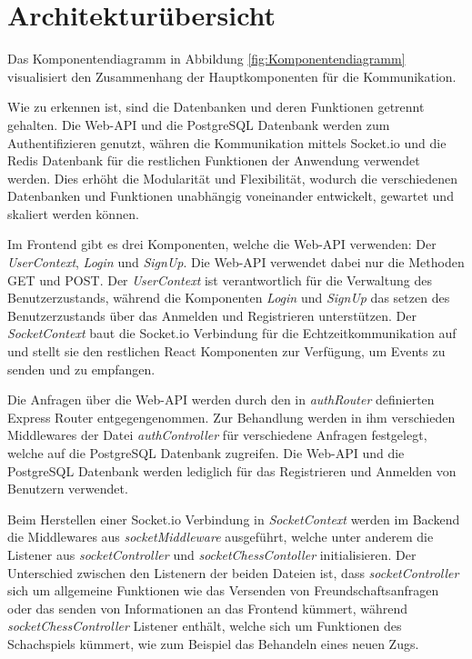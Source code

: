 \section{Architekturübersicht}
Das Komponentendiagramm in Abbildung \ref{fig:Komponentendiagramm} visualisiert den Zusammenhang der Hauptkomponenten für die Kommunikation.

Wie zu erkennen ist, sind die Datenbanken und deren Funktionen getrennt gehalten. Die Web-API und die PostgreSQL Datenbank werden zum Authentifizieren genutzt, währen die Kommunikation mittels Socket.io und die Redis Datenbank für die restlichen Funktionen der Anwendung verwendet werden. Dies erhöht die Modularität und Flexibilität, wodurch die verschiedenen Datenbanken und Funktionen unabhängig voneinander entwickelt, gewartet und skaliert werden können.

Im Frontend gibt es drei Komponenten, welche die Web-API verwenden: Der \textit{UserContext}, \textit{Login} und \textit{SignUp}. Die Web-API verwendet dabei nur die Methoden GET und POST. Der \textit{UserContext} ist verantwortlich für die Verwaltung des Benutzerzustands, während die Komponenten \textit{Login} und \textit{SignUp} das setzen des Benutzerzustands über das Anmelden und Registrieren unterstützen. Der \textit{SocketContext} baut die Socket.io Verbindung für die Echtzeitkommunikation auf und stellt sie den restlichen React Komponenten zur Verfügung, um Events zu senden und zu empfangen.

Die Anfragen über die Web-API werden durch den in \textit{authRouter} definierten Express Router entgegengenommen. Zur Behandlung werden in ihm verschieden Middlewares der Datei \textit{authController} für verschiedene Anfragen festgelegt, welche auf die PostgreSQL Datenbank zugreifen. Die Web-API und die PostgreSQL Datenbank werden lediglich für das Registrieren und Anmelden von Benutzern verwendet.

Beim Herstellen einer Socket.io Verbindung in \textit{SocketContext} werden im Backend die Middlewares aus \textit{socketMiddleware} ausgeführt, welche unter anderem die Listener aus \textit{socketController} und \textit{socketChessContoller} initialisieren. Der Unterschied zwischen den Listenern der beiden Dateien ist, dass \textit{socketController} sich um allgemeine Funktionen wie das Versenden von Freundschaftsanfragen oder das senden von Informationen an das Frontend kümmert, während \textit{socketChessController} Listener enthält, welche sich um Funktionen des Schachspiels kümmert, wie zum Beispiel das Behandeln eines neuen Zugs. 

